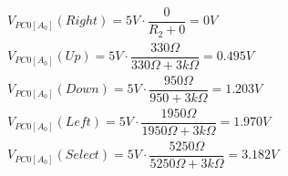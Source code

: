 \documentclass[10pt, a4paper]{article}%
\begin{document}
\begin{equation}
\begin{split}
&V_{PC0[A_0]}(Right) = 5V\cdot \dfrac{0}{R_2 + 0 } = 0V\\
&V_{PC0[A_0]}(Up) = 5V\cdot \dfrac{330\Omega}{330\Omega + 3k\Omega } = 0.495V\\
&V_{PC0[A_0]}(Down) = 5V\cdot \dfrac{950\Omega}{950 + 3k\Omega } = 1.203V\\
&V_{PC0[A_0]}(Left) = 5V\cdot \dfrac{1950\Omega}{1950\Omega + 3k\Omega } = 1.970V\\
&V_{PC0[A_0]}(Select) = 5V\cdot \dfrac{5250\Omega}{5250\Omega + 3k\Omega } = 3.182V\\
\end{split}
\end{equation}
\end{document}

